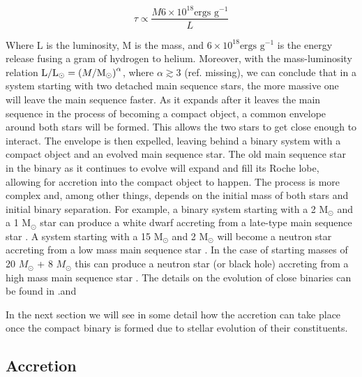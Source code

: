 \begin{equation}
        \tau \propto \frac{ M 6 \times 10^{18} \text{ergs g}^{-1}}{L}
\end{equation}

Where L is the luminosity, M is the mass,  and $6\times 10^{18} \text{ergs g}^{-1}$ is the energy release fusing a gram of hydrogen to helium. Moreover, with the mass-luminosity relation $ \text L / \text L _\odot = \left  (M / \text M _\odot \right )^\alpha $, where $\alpha \gtrsim 3$ (ref. missing), we can conclude that in a system starting with two detached main sequence stars, the more massive one will leave the main sequence faster. As it expands after it leaves the main sequence in the process of becoming a compact object, a common envelope around both stars will be formed. This allows the two stars to get close enough to interact. The envelope is then expelled, leaving behind a binary system with a compact object and an evolved main sequence star. The old main sequence star in the binary as it continues to evolve will expand and fill its Roche lobe, allowing for accretion into the compact object to happen.  The process is more complex and, among other things, depends on the initial mass of both stars and initial binary separation. For example, a binary system starting with a 2 M$_\odot$  and  a 1 M$_\odot$ star can produce a white dwarf accreting from a late-type main sequence star \citep{kippenhahn_entwicklung_1967,de_loore_structure_1992}. A system starting with a 15 M$_\odot$ and 2 M$_\odot$ will become a neutron star accreting from a low mass main sequence star \citep{heuvel_late_1976}. In the case of starting masses of 20 $M_\odot$ + 8 $M_\odot$ this can produce a neutron star (or black hole) accreting from a high mass main sequence star \citep{heuvel_late_1976}. The details on the evolution of close binaries can be found in \cite{postnov_evolution_2014}.and \citep{de2008stars}


In the next section we will see in some detail how the accretion can take place once the compact binary is formed due to stellar evolution of their constituents. 

\subsection{Accretion}

